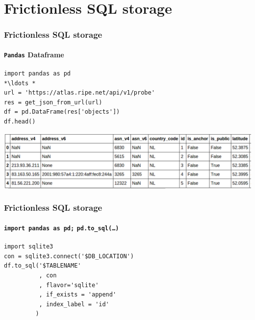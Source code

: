\section{Frictionless SQL storage}
\begin{frame}[fragile]
  \frametitle{Frictionless SQL storage}
  \framesubtitle{\texttt{Pandas} Dataframe}
    \begin{lstlisting}
import pandas as pd
*\ldots * 
url = 'https://atlas.ripe.net/api/v1/probe'
res = get_json_from_url(url)
df = pd.DataFrame(res['objects'])
df.head()
    \end{lstlisting}
    \centering
    \includegraphics[width=1.0\linewidth]{figures/pandas-to-sql}\\
\end{frame}




\begin{frame}[fragile]
  \frametitle{Frictionless SQL storage}
  \framesubtitle{\texttt{import pandas as pd;} \texttt{pd.to\_sql(\dots)}}

    \begin{lstlisting}
import sqlite3
con = sqlite3.connect('$DB_LOCATION')
df.to_sql('$TABLENAME'
          , con
          , flavor='sqlite'
          , if_exists = 'append'
          , index_label = 'id'
         )
    \end{lstlisting}
\end{frame}

